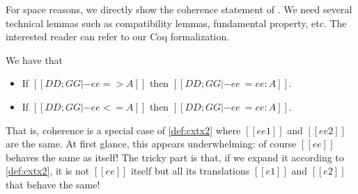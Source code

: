 For space reasons, we directly show the coherence statement of \fnamee.
We need several technical lemmas such as compatibility lemmas, fundamental property, etc.
The interested reader can refer to our Coq formalization.

\begin{theorem}[Coherence] \label{thm:coherence:fi}
  We have that
  \begin{itemize}
  \item If $[[DD ; GG |- ee => A ]]$ then $[[DD ; GG |- ee ~= ee : A]]$.
  \item If $[[DD ; GG |- ee <= A ]]$ then $[[DD ; GG |- ee ~= ee : A]]$.
  \end{itemize}
\end{theorem}
\noindent That is, coherence is a special case of \cref{def:cxtx2} where
$[[ee1]]$ and $[[ee2]]$ are the same. At first glance, this
appears underwhelming: of course $[[ee]]$ behaves the same as itself! The tricky
part is that, if we expand it according to \cref{def:cxtx2}, it is not $[[ee]]$
itself but all its translations $[[e1]]$ and $[[e2]]$ that behave the same!




